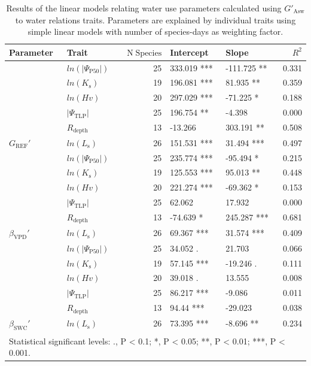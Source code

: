 \documentclass[11pt,twoside]{reedthesis}
\begin{document}
\newpage
\begin{table}[H]

\caption[Results of the linear models relating water use parameters calculated using $G'_{\text{Asw}}$ to water relations traits.]{\label{tab:tab1}Results of the linear models relating water use parameters calculated using $G'_{\text{Asw}}$ to water relations traits. Parameters are explained by individual traits using simple linear models with number of species-days as weighting factor.}
\centering
\fontsize{12}{14}\selectfont
\begin{tabular}[t]{llrllr}
\toprule
Parameter & Trait & $\text{N}\;\text{Species}$ & Intercept & Slope & $R^2$\\
\midrule
 & $ln(\rvert\Psi_{\text{P50}}\rvert)$ & 25 & 333.019 *** & -111.725 ** & 0.331\\
\cmidrule{2-6}
 & $ln(K_{\text{s}})$ & 19 & 196.081 *** & 81.935 ** & 0.359\\
\cmidrule{2-6}
 & $ln(Hv)$ & 20 & 297.029 *** & -71.225 * & 0.188\\
\cmidrule{2-6}
 & $\rvert\Psi_{\text{TLP}}\rvert$ & 25 & 196.754 ** & -4.398 & 0.000\\
\cmidrule{2-6}
 & $R_{\text{depth}}$ & 13 & -13.266 & 303.191 ** & 0.508\\
\cmidrule{2-6}
\multirow{-6}{*}{\raggedright\arraybackslash $G_{\text{REF}}'$} & $ln(L_{\text{s}})$ & 26 & 151.531 *** & 31.494 *** & 0.497\\
\cmidrule{1-6}
 & $ln(\rvert\Psi_{\text{P50}}\rvert)$ & 25 & 235.774 *** & -95.494 * & 0.215\\
\cmidrule{2-6}
 & $ln(K_{\text{s}})$ & 19 & 125.553 *** & 95.013 ** & 0.448\\
\cmidrule{2-6}
 & $ln(Hv)$ & 20 & 221.274 *** & -69.362 * & 0.153\\
\cmidrule{2-6}
 & $\rvert\Psi_{\text{TLP}}\rvert$ & 25 & 62.062 & 17.932 & 0.000\\
\cmidrule{2-6}
 & $R_{\text{depth}}$ & 13 & -74.639 * & 245.287 *** & 0.681\\
\cmidrule{2-6}
\multirow{-6}{*}{\raggedright\arraybackslash $\beta_{\text{VPD}}'$} & $ln(L_{\text{s}})$ & 26 & 69.367 *** & 31.574 *** & 0.409\\
\cmidrule{1-6}
 & $ln(\rvert\Psi_{\text{P50}}\rvert)$ & 25 & 34.052 . & 21.703 & 0.066\\
\cmidrule{2-6}
 & $ln(K_{\text{s}})$ & 19 & 57.145 *** & -19.246 . & 0.111\\
\cmidrule{2-6}
 & $ln(Hv)$ & 20 & 39.018 . & 13.555 & 0.008\\
\cmidrule{2-6}
 & $\rvert\Psi_{\text{TLP}}\rvert$ & 25 & 86.217 *** & -9.086 & 0.011\\
\cmidrule{2-6}
 & $R_{\text{depth}}$ & 13 & 94.44 *** & -29.023 & 0.038\\
\cmidrule{2-6}
\multirow{-6}{*}{\raggedright\arraybackslash $\beta_{\text{SWC}}'$} & $ln(L_{\text{s}})$ & 26 & 73.395 *** & -8.696 ** & 0.234\\
\bottomrule
\multicolumn{6}{l}{\textsuperscript{} Statistical significant levels: ., P < 0.1; *, P < 0.05; **, P < 0.01; ***, P < 0.001.}\\
\end{tabular}
\end{table}
\end{document}
